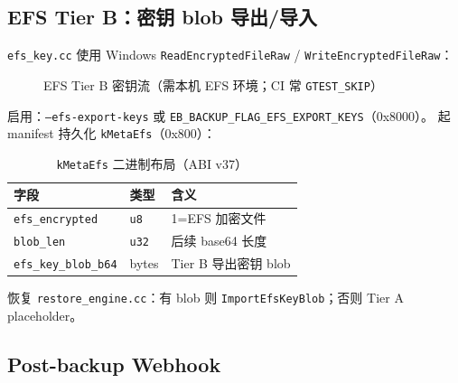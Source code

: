 \subsection{EFS Tier B：密钥 blob 导出/导入}

\texttt{efs\_key.cc} 使用 Windows \texttt{ReadEncryptedFileRaw} / \texttt{WriteEncryptedFileRaw}：

\begin{figure}[htbp]
\centering
{}
\caption{EFS Tier B 密钥流（需本机 EFS 环境；CI 常 \texttt{GTEST\_SKIP}）}
\label{fig:efs-tier-b}
\end{figure}

启用：\texttt{--efs-export-keys} 或 \texttt{EB\_BACKUP\_FLAG\_EFS\_EXPORT\_KEYS}（0x8000）。 起 manifest 持久化 \texttt{kMetaEfs}（0x800）：

\begin{longtable}{@{}llp{8cm}@{}}
\caption{\texttt{kMetaEfs} 二进制布局（ABI v37）} \\
\toprule
字段 & 类型 & 含义 \\
\midrule
\texttt{efs\_encrypted} & \texttt{u8} & 1=EFS 加密文件 \\
\texttt{blob\_len} & \texttt{u32} & 后续 base64 长度 \\
\texttt{efs\_key\_blob\_b64} & bytes & Tier B 导出密钥 blob \\
\bottomrule
\end{longtable}

恢复 \texttt{restore\_engine.cc}：有 blob 则 \texttt{ImportEfsKeyBlob}；否则 Tier A placeholder。

\subsection{Post-backup Webhook}

